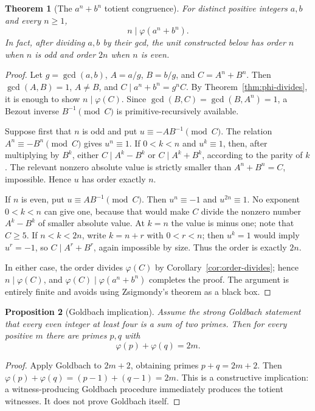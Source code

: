 \documentclass[11pt]{article}
\newtheorem{theorem}{Theorem}[section]
\newtheorem{proposition}[theorem]{Proposition}
\theoremstyle{definition}
\begin{document}
\begin{theorem}[The \(a^n+b^n\) totient congruence]\label{thm:plus-power}
For distinct positive integers \(a,b\) and every \(n\ge1\),
\[
 \boxed{n\mid\varphi(a^n+b^n).}
\]
In fact, after dividing \(a,b\) by their gcd, the unit constructed below has
order \(n\) when \(n\) is odd and order \(2n\) when \(n\) is even.
\end{theorem}

\begin{proof}
Let \(g=\gcd(a,b)\), \(A=a/g\), \(B=b/g\), and
\(C=A^n+B^n\).  Then \(\gcd(A,B)=1\), \(A\ne B\), and
\(C\mid a^n+b^n=g^nC\).  By Theorem~\ref{thm:phi-divides}, it is enough to
show \(n\mid\varphi(C)\).  Since
\(\gcd(B,C)=\gcd(B,A^n)=1\), a Bezout inverse \(B^{-1}\pmod C\) is
primitive-recursively available.

Suppose first that \(n\) is odd and put
\(u\equiv-A B^{-1}\pmod C\).  The relation
\(A^n\equiv-B^n\pmod C\) gives \(u^n\equiv1\).  If
\(0<k<n\) and \(u^k\equiv1\), then, after multiplying by \(B^k\), either
\(C\mid A^k-B^k\) or \(C\mid A^k+B^k\), according to the parity of \(k\).
The relevant nonzero absolute value is strictly smaller than
\(A^n+B^n=C\), impossible.  Hence \(u\) has order exactly \(n\).

If \(n\) is even, put \(u\equiv A B^{-1}\pmod C\).  Then
\(u^n\equiv-1\) and \(u^{2n}\equiv1\).  No exponent
\(0<k<n\) can give one, because that would make \(C\) divide the nonzero
number \(A^k-B^k\) of smaller absolute value.  At \(k=n\) the value is
minus one; note that \(C\ge5\).  If \(n<k<2n\), write \(k=n+r\) with
\(0<r<n\); then \(u^k=1\) would imply \(u^r=-1\), so
\(C\mid A^r+B^r\), again impossible by size.  Thus the order is exactly
\(2n\).

In either case, the order divides \(\varphi(C)\) by
Corollary~\ref{cor:order-divides}; hence \(n\mid\varphi(C)\), and
\(\varphi(C)\mid\varphi(a^n+b^n)\) completes the proof.  The argument is
entirely finite and avoids using Zsigmondy's theorem as a black box.
\end{proof}

\begin{proposition}[Goldbach implication]\label{prop:goldbach-phi}
Assume the strong Goldbach statement that every even integer at least four is
a sum of two primes.  Then for every positive \(m\) there are primes \(p,q\)
with
\[
 \varphi(p)+\varphi(q)=2m.
\]
\end{proposition}

\begin{proof}
Apply Goldbach to \(2m+2\), obtaining primes \(p+q=2m+2\).  Then
\(\varphi(p)+\varphi(q)=(p-1)+(q-1)=2m\).  This is a constructive implication:
a witness-producing Goldbach procedure immediately produces the totient
witnesses.  It does not prove Goldbach itself.
\end{proof}
\end{document}
